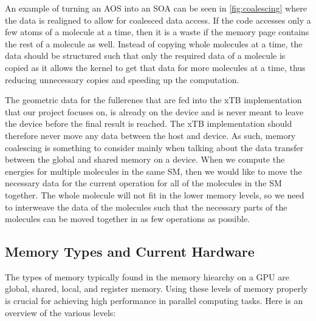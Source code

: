 An example of turning an AOS into an SOA can be seen in \autoref{fig:coalescing} where the data is realigned to allow for coalesced data access. If the code accesses only a few atoms of a molecule at a time, then it is a waste if the memory page contains the rest of a molecule as well. Instead of copying whole molecules at a time, the data should be structured such that only the required data of a molecule is copied as it allows the kernel to get that data for more molecules at a time, thus reducing unnecessary copies and speeding up the computation.

The geometric data for the fullerenes that are fed into the xTB implementation that our project focuses on, is already on the device and is never meant to leave the device before the final result is reached. The xTB implementation should therefore never move any data between the host and device. As such, memory coalescing is something to consider mainly when talking about the data transfer between the global and shared memory on a device. When we compute the energies for multiple molecules in the same SM, then we would like to move the necessary data for the current operation for all of the molecules in the SM together. The whole molecule will not fit in the lower memory levels, so we need to interweave the data of the molecules such that the necessary parts of the molecules can be moved together in as few operations as possible.




\subsection{Memory Types and Current Hardware}

The types of memory typically found in the memory hiearchy on a GPU are global, shared, local, and register memory. Using these levels of memory properly is crucial for achieving high performance in parallel computing tasks. Here is an overview of the various levels:

